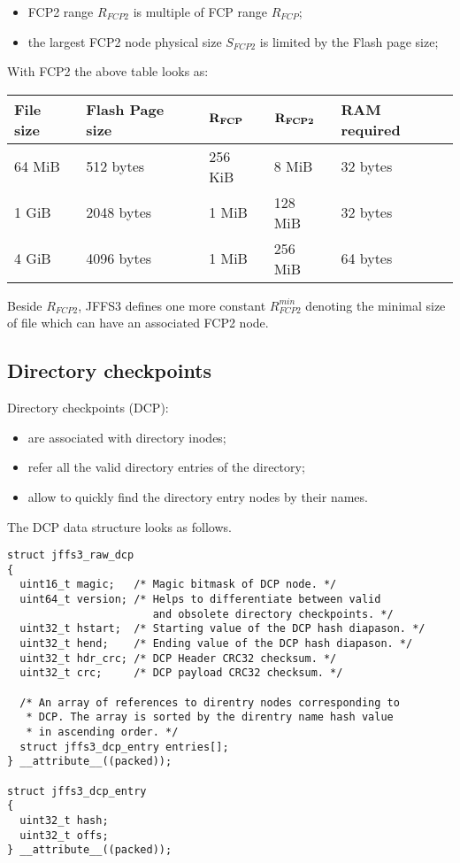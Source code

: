 \documentclass[12pt,a4paper,oneside,titlepage]{article}
\begin{document}
\begin{itemize}
\item FCP2 range $R_{FCP2}$ is multiple of FCP range $R_{FCP}$;
\item the largest FCP2 node physical size $S_{FCP2}$ is limited by the
Flash page size;
\end{itemize}

With FCP2 the above table looks as:
\begin{center}
\begin{tabular}{lllll}
\textbf{File size} & \textbf{Flash Page size} &
$\bf R_{FCP}$ & $\bf R_{FCP2}$
& \textbf{RAM required}\\
\hline
64 MiB  & 512 bytes  & 256 KiB & 8 MiB   & 32 bytes\\
1 GiB   & 2048 bytes & 1 MiB   & 128 MiB & 32 bytes\\
4 GiB   & 4096 bytes & 1 MiB   & 256 MiB & 64 bytes\\
\end{tabular}
\end{center}

Beside $R_{FCP2}$, JFFS3 defines one more constant $R_{FCP2}^{min}$
denoting the minimal size of file which can have an
associated FCP2 node.

%
%
\subsection{Directory checkpoints}
Directory checkpoints (DCP):
\begin{itemize}
\item are associated with directory inodes;
\item refer all the valid directory entries of the directory;
\item allow to quickly find the directory entry nodes by their names.
\end{itemize}

The DCP data structure looks as follows.

\begin{verbatim}
struct jffs3_raw_dcp
{
  uint16_t magic;   /* Magic bitmask of DCP node. */
  uint64_t version; /* Helps to differentiate between valid
                       and obsolete directory checkpoints. */
  uint32_t hstart;  /* Starting value of the DCP hash diapason. */
  uint32_t hend;    /* Ending value of the DCP hash diapason. */
  uint32_t hdr_crc; /* DCP Header CRC32 checksum. */
  uint32_t crc;     /* DCP payload CRC32 checksum. */
  
  /* An array of references to direntry nodes corresponding to
   * DCP. The array is sorted by the direntry name hash value
   * in ascending order. */
  struct jffs3_dcp_entry entries[];
} __attribute__((packed));

struct jffs3_dcp_entry
{
  uint32_t hash;
  uint32_t offs;
} __attribute__((packed));
\end{verbatim}
\end{document}
